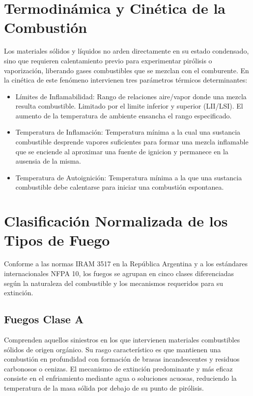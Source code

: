 \section{Termodinámica y Cinética de la Combustión}

Los materiales sólidos y líquidos no arden directamente en su estado condensado, sino que requieren calentamiento previo
para experimentar pirólisis o vaporización, liberando gases combustibles que se mezclan con el comburente. En la cinética
de este fenómeno intervienen tres parámetros térmicos determinantes:
\begin{itemize}
    \item Límites de Inflamabilidad: Rango de relaciones aire/vapor donde una mezcla resulta combustible. Limitado por
      el limite inferior y superior (LII/LSI). El aumento de la temperatura de ambiente ensancha el rango especificado.
    \item Temperatura de Inflamación: Temperatura mínima a la cual una sustancia combustible desprende vapores
      suficientes para formar una mezcla inflamable que se enciende al aproximar una fuente de ignicion y permanece en
      la ausensia de la misma. 
    \item Temperatura de Autoignición: Temperatura mínima a la que una sustancia combustible debe calentarse para
      iniciar una combustión espontanea.
\end{itemize}

\section{Clasificación Normalizada de los Tipos de Fuego}
\label{sec.cap2:clases_fuego}

Conforme a las normas IRAM 3517 en la República Argentina y a los estándares internacionales NFPA 10, los fuegos se
agrupan en cinco clases diferenciadas según la naturaleza del combustible y los mecanismos requeridos para su extinción.

\subsection{Fuegos Clase A}
Comprenden aquellos siniestros en los que intervienen materiales combustibles sólidos de origen orgánico. Su rasgo
característico es que mantienen una combustión en profundidad con formación de brasas incandescentes y residuos
carbonosos o cenizas. El mecanismo de extinción predominante y más eficaz consiste en el enfriamiento mediante agua o
soluciones acuosas, reduciendo la temperatura de la masa sólida por debajo de su punto de pirólisis.

